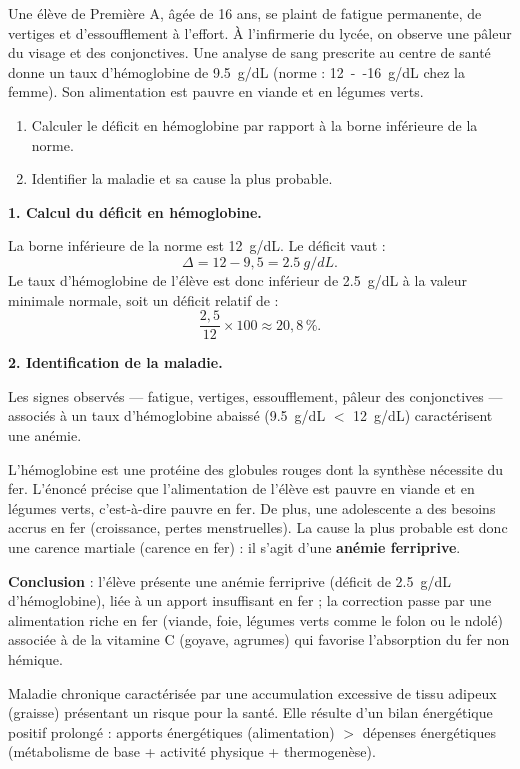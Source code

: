 \documentclass[11pt]{article}
\newcommand{\cle}[1]{{\popxbold\color{popdark}#1}}
\newcounter{popsec}
\newcounter{popsub}
\newcommand{\courssub}[1]{%
  \stepcounter{popsub}%
  \par\vspace{9pt}\noindent{\popxbold\fontsize{11.5}{13}\selectfont\color{popink}{\color{poporange}\thepopsec.\thepopsub}\hspace{6pt}#1}\par\nopagebreak\vspace{4pt}
}
\begin{document}
\begin{exoresolu}
Une élève de Première A, âgée de 16 ans, se plaint de fatigue permanente, de vertiges et d'essoufflement à l'effort. À l'infirmerie du lycée, on observe une pâleur du visage et des conjonctives. Une analyse de sang prescrite au centre de santé donne un taux d'hémoglobine de \SI{9,5}{g/dL} (norme : \SI{12}{--}\SI{16}{g/dL} chez la femme). Son alimentation est pauvre en viande et en légumes verts.
\begin{enumerate}
\item Calculer le déficit en hémoglobine par rapport à la borne inférieure de la norme.
\item Identifier la maladie et sa cause la plus probable.
\end{enumerate}
\tcblower
\textbf{1. Calcul du déficit en hémoglobine.}

La borne inférieure de la norme est \SI{12}{g/dL}. Le déficit vaut :
\[ \Delta = 12 - 9,5 = \SI{2,5}{g/dL}. \]
Le taux d'hémoglobine de l'élève est donc inférieur de \SI{2,5}{g/dL} à la valeur minimale normale, soit un déficit relatif de :
\[ \frac{2,5}{12} \times 100 \approx 20,8\,\%. \]

\textbf{2. Identification de la maladie.}

Les signes observés — fatigue, vertiges, essoufflement, pâleur des conjonctives — associés à un taux d'hémoglobine abaissé (\SI{9,5}{g/dL} $<$ \SI{12}{g/dL}) caractérisent une \cle{anémie}.

L'hémoglobine est une protéine des globules rouges dont la synthèse nécessite du \cle{fer}. L'énoncé précise que l'alimentation de l'élève est pauvre en viande et en légumes verts, c'est-à-dire pauvre en fer. De plus, une adolescente a des besoins accrus en fer (croissance, pertes menstruelles). La cause la plus probable est donc une \cle{carence martiale} (carence en fer) : il s'agit d'une \textbf{anémie ferriprive}.

\textbf{Conclusion} : l'élève présente une anémie ferriprive (déficit de \SI{2,5}{g/dL} d'hémoglobine), liée à un apport insuffisant en fer ; la correction passe par une alimentation riche en fer (viande, foie, légumes verts comme le folon ou le ndolé) associée à de la vitamine C (goyave, agrumes) qui favorise l'absorption du fer non hémique.
\end{exoresolu}

\courssub{Les maladies de surcharge : l'obésité}

\begin{definition}[Obésité]
Maladie chronique caractérisée par une \cle{accumulation excessive de tissu adipeux} (graisse) présentant un risque pour la santé. Elle résulte d'un \cle{bilan énergétique positif prolongé} : apports énergétiques (alimentation) $>$ dépenses énergétiques (métabolisme de base + activité physique + thermogenèse).
\end{definition}
\end{document}
